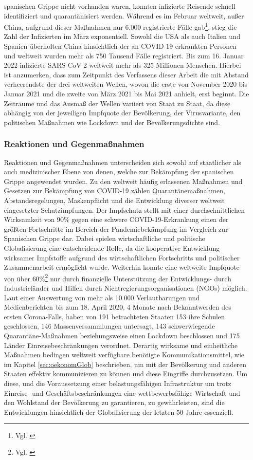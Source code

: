 \documentclass[12pt]{article}
\begin{document}
spanischen Grippe nicht vorhanden waren, konnten infizierte Reisende schnell identifiziert und quarantänisiert werden. Während es im Februar weltweit, außer China, aufgrund dieser Maßnahmen nur 6.000 registrierte Fälle gab\footnote{Vgl. \cite{Feb2020}}, stieg die Zahl der Infizierten im März exponentiell. Sowohl die USA als auch Italien und Spanien überholten China hinsichtlich der an COVID-19 erkrankten Personen und weltweit wurden mehr als 750 Tausend Fälle registriert. Bis zum 16. Januar 2022 infizierte SARS-CoV-2 weltweit mehr als 325 Millionen Menschen. Hierbei ist anzumerken, dass zum Zeitpunkt des Verfassens dieser Arbeit die mit Abstand verheerendste der drei weltweiten Wellen, wovon die erste von November 2020 bis Januar 2021 und die zweite von März 2021 bis Mai 2021 anhielt, erst beginnt. Die Zeiträume und das Ausmaß der Wellen variiert von Staat zu Staat, da diese abhängig von der jeweiligen Impfquote der Bevölkerung, der Virusvariante, den politischen Maßnahmen wie Lockdown und der Bevölkerungsdichte sind.

\subsubsection{Reaktionen und Gegenmaßnahmen}
Reaktionen und Gegenmaßnahmen unterscheiden sich sowohl auf staatlicher als auch medizinischer Ebene von denen, welche zur Bekämpfung der spanischen Grippe angewendet wurden. Zu den weltweit häufig erlassenen Maßnahmen und Gesetzen zur Bekämpfung von COVID-19 zählen Quarantänemaßnahmen, Abstandsregelungen, Maskenpflicht und die Entwicklung diverser weltweit eingesetzter Schutzimpfungen. Der Impfschutz stellt mit einer durchschnittlichen Wirksamkeit von 90\% gegen eine schwere COVID-19-Erkrankung einen der größten Fortschritte im Bereich der Pandemiebekämpfung im Vergleich zur Spanischen Grippe dar. Dabei spielen wirtschaftliche und politische Globalisierung eine entscheidende Rolle, da die kooperative Entwicklung wirksamer Impfstoffe aufgrund des wirtschaftlichen Fortschritts und politischer Zusammenarbeit ermöglicht wurde. Weiterhin konnte eine weltweite Impfquote von über 60\%\footnote{Vgl. \cite{NYT22}} nur durch finanzielle Unterstützung der Entwicklungs- durch Industrieländer und Hilfen durch Nichtregierungsorganisationen (NGOs) möglich. Laut einer Auswertung von mehr als 10.000 Verlautbarungen und Medienberichten bis zum 18. April 2020, 4 Monate nach Bekanntwerden des ersten Corona-Falls, haben von 191 betrachteten Staaten 153 ihre Schulen geschlossen, 146 Massenversammlungen untersagt, 143 schwerwiegende Quarantäne-Maßnahmen beziehungsweise einen Lockdown beschlossen und 175 Länder Einreisebeschränkungen verordnet. Derartig wirksame und einheitliche Maßnahmen bedingen weltweit verfügbare benötigte Kommunikationsmittel, wie im Kapitel \ref{sec:oekonomGlob} beschrieben, um mit der Bevölkerung und anderen Staaten effektiv kommunizieren zu können und diese Eingriffe durchzusetzen. Um diese, und die Voraussetzung einer belastungsfähigen Infrastruktur um trotz Einreise- und Geschäftsbeschränkungen eine wettbewerbsfähige Wirtschaft und den Wohlstand der Bevölkerung zu garantieren, zu gewährleisten, sind die Entwicklungen hinsichtlich der Globalisierung der letzten 50 Jahre essenziell.
\end{document}
